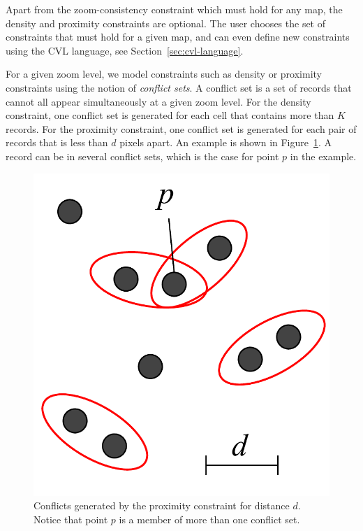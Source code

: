 Apart from the zoom-consistency constraint which must hold for any map, the density and proximity constraints are optional. The user chooses the set of constraints that must hold for a given map, and can even define new constraints using the CVL language, see Section~\ref{sec:cvl-language}.

For a given zoom level, we model constraints such as density or proximity constraints using the notion of \emph{conflict sets}. A conflict set is a set of records that cannot all appear simultaneously at a given zoom level. For the density constraint, one conflict set is generated for each cell that contains more than $K$ records. For the proximity constraint, one conflict set is generated for each pair of records that is less than $d$ pixels apart. An example is shown in Figure~\ref{fig:proximity:conflict}. A record can be in several conflict sets, which is the case for point $p$ in the example.

\begin{figure}[htbp]
\begin{center}
\includegraphics[scale=.4]{figs/cvl_proximity_conflicts.pdf}
\caption{Conflicts generated by the proximity constraint for distance $d$. Notice that point $p$ is a member of more than one conflict set.}
\label{fig:proximity:conflict}
\end{center}
\end{figure}

